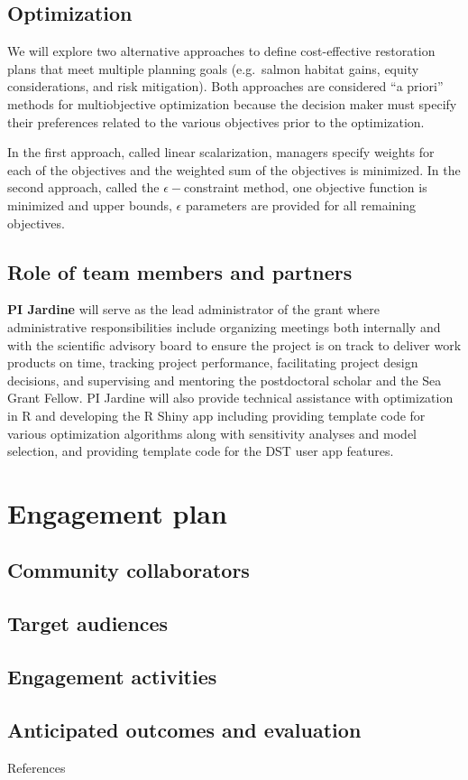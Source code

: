 \documentclass[12pt]{elsarticle}
\begin{document}
\subsection{Optimization}

We will explore two alternative approaches to define cost-effective restoration plans that meet multiple planning goals (e.g.\ salmon habitat gains, equity considerations, and risk mitigation). Both approaches are considered ``a priori'' methods for multiobjective optimization because the decision maker must specify their preferences related to the various objectives prior to the optimization. 

In the first approach, called linear scalarization, managers specify weights for each of the objectives and the weighted sum of the objectives is minimized. In the second approach, called the $\epsilon-$constraint method, one objective function is minimized and upper bounds, $\epsilon$ parameters are provided for all remaining objectives.




\subsection{Role of team members and partners}
\textbf{PI Jardine} will serve as the lead administrator of the grant where administrative responsibilities include organizing meetings both internally and with the scientific advisory board to ensure the project is on track to deliver work products on time, tracking project performance, facilitating project design decisions, and supervising and mentoring the postdoctoral scholar and the Sea Grant Fellow.  PI Jardine will also provide technical assistance with optimization in R and developing the R Shiny app including providing template code for various optimization algorithms along with sensitivity analyses and model selection, and providing template code for the DST user app features.\\


%
\section{Engagement plan}
\subsection{Community collaborators} 
\subsection{Target audiences}
\subsection{Engagement activities}
\subsection{Anticipated outcomes and evaluation}

\clearpage
\large References\\
\normalsize

\end{document}

